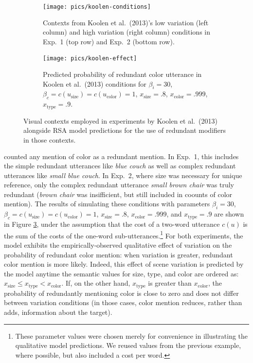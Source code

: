 \documentclass[11pt]{article}
\newcommand{\figref}[1]{Figure \ref{#1}}
\begin{document}
\begin{figure}
\begin{subfigure}{.5\textwidth}
\texttt{[image: pics/koolen-conditions]}
\caption{Contexts from Koolen et al.~(2013)'s low variation (left column) and high variation (right column) conditions in Exp.~1 (top row) and Exp.~2 (bottom row).}
\label{fig:koolencontexts}
\end{subfigure}
\begin{subfigure}{.5\textwidth}
\centering
\texttt{[image: pics/koolen-effect]}
\caption{Predicted probability of redundant color utterance in Koolen et al.~(2013) conditions for $\beta_i = 30$, $ \beta_c = c(u_{\textrm{size}}) = c(u_{\textrm{color}}) = 1$, $x_{\text{size}} = .8$, $x_{\text{color}} = .999$, $x_{\text{type}} = .9$.}
\label{fig:koolensimulationresults}
\end{subfigure}
\caption{Visual contexts employed in experiments by Koolen et al.~(2013) alongside RSA model predictions for the use of redundant modifiers in those contexts.}
\end{figure}

 counted any mention of color as a redundant mention. In Exp.~1, this includes the simple redundant utterances like \emph{blue couch} as well as complex redundant utterances like \emph{small blue couch}. In Exp.~2, where size was necessary for unique reference, only the complex redundant utterance \emph{small brown chair} was truly redundant (\emph{brown chair} was insifficient, but still included in coounts of color mention).  The results of simulating these conditions with parameters $\beta_i = 30$, $ \beta_c = c(u_{\textrm{size}}) = c(u_{\textrm{color}}) = 1$, $x_{\text{size}} = .8$, $x_{\text{color}} = .999$, and $x_{\text{type}} = .9$ are shown in \figref{fig:koolensimulationresults}, under the assumption that the cost of a two-word utterance $c(u)$ is the sum of the costs of the one-word sub-utterances.\footnote{These parameter values were chosen merely for convenience in illustrating the qualitative model predictions. We reused values from the previous example, where possible, but also included a cost per word.}
For both experiments, the model exhibits the empirically-observed qualitative effect of variation on the probability of redundant color mention: when variation is greater, redundant color mention is more likely. 
Indeed, this effect of scene variation is predicted by the model anytime the semantic values for size, type, and color are ordered as: $x_{\text{size}} \leq  x_{\text{type}} < x_{\text{color}}$. If, on the other hand, $x_{\text{type}}$ is greater than $x_{\text{color}}$, the probability of redundantly mentioning color is close to zero and does not differ between variation conditions (in those cases, color mention reduces, rather than adds, information about the target). 
\end{document}
